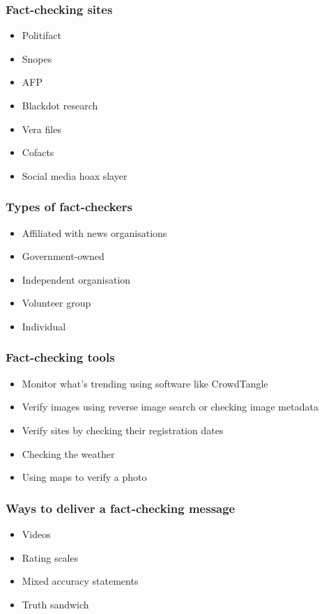 \documentclass[11pt]{article}
\begin{document}
\subsubsection{Fact-checking sites}
\label{sec:orga376a08}
\begin{itemize}
\item Politifact
\item Snopes
\item AFP
\item Blackdot research
\item Vera files
\item Cofacts
\item Social media hoax slayer
\end{itemize}
\subsubsection{Types of fact-checkers}
\label{sec:org5dc49c8}
\begin{itemize}
\item Affiliated with news organisations
\item Government-owned
\item Independent organisation
\item Volunteer group
\item Individual
\end{itemize}
\subsubsection{Fact-checking tools}
\label{sec:orgc9d9075}
\begin{itemize}
\item Monitor what's trending using software like CrowdTangle
\item Verify images using reverse image search or checking image metadata
\item Verify sites by checking their registration dates
\item Checking the weather
\item Using maps to verify a photo
\end{itemize}
\subsubsection{Ways to deliver a fact-checking message}
\label{sec:org17f0f4c}
\begin{itemize}
\item Videos
\item Rating scales
\item Mixed accuracy statements
\item Truth sandwich
\end{itemize}
\end{document}
